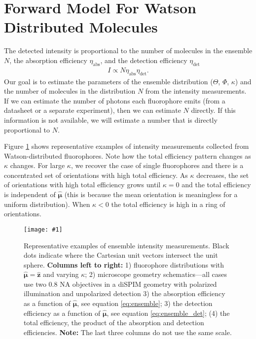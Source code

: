 \documentclass[11pt]{article}
\providecommand{\mb}[1]{\mathbf{#1}}
\providecommand{\bs}[1]{\boldsymbol{#1}}
\providecommand{\fig}[4]{
\begin{figure}[h]
 \captionsetup{width=1.0\linewidth}
 \centering
 \texttt{[image: \#1]}
 \caption{#3}
 \label{fig:#4}
\end{figure}
}
\begin{document}
\section{Forward Model For Watson Distributed Molecules}
The detected intensity is proportional to the number of molecules in the
ensemble $N$, the absorption efficiency $\eta_{\text{abs}}$, and the detection
efficiency $\eta_{\text{det}}$
\begin{align}
  I \propto N\eta_{\text{abs}}\eta_{\text{det}}. 
\end{align}
Our goal is to estimate the parameters of the ensemble distribution
($\Theta$, $\Phi$, $\kappa$) and the number of molecules in the distribution $N$
from the intensity measurements. If we can estimate the number of photons each
fluorophore emits (from a datasheet or a separate experiment), then we can
estimate $N$ directly. If this information is not available, we will estimate a
number that is directly proportional to $N$.

Figure \ref{fig:single-frame} shows representative examples of intensity
measurements collected from Watson-distributed fluorophores. Note how the total
efficiency pattern changes as $\kappa$ changes. For large $\kappa$, we recover
the case of single fluorophores and there is a concentrated set of orientations
with high total efficiency. As $\kappa$ decreases, the set of orientations with
high total efficiency grows until $\kappa = 0$ and the total efficiency is
independent of $\bs{\hat{\mu}}$ (this is because the mean orientation is
meaningless for a uniform distribution). When $\kappa < 0$ the total efficiency
is high in a ring of orientations.

\fig{../figures/single-frame.pdf}{1.0}{Representative examples of ensemble
  intensity measurements. Black dots indicate where the Cartesian unit vectors
  intersect the unit sphere. \newline \newline \textbf{Columns left to right:}
  1) fluorophore distributions with $\bs{\hat{\mu}} = \mb{\hat{z}}$ and varying
  $\kappa$; 2) microscope geometry schematics---all cases use two 0.8 NA
  objectives in a diSPIM geometry with polarized illumination and unpolarized
  detection 3) the absorption efficiency as a function of $\bs{\hat{\mu}}$, see
  equation \ref{eq:ensemble}; 3) the detection efficiency as a function of
  $\bs{\hat{\mu}}$, see equation \ref{eq:ensemble_det}; (4) the total
  efficiency, the product of the absorption and detection
  efficiencies. \textbf{Note:} The last three columns do not use the same
  scale.}{single-frame}
\end{document}
